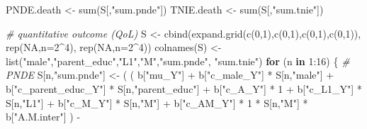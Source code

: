 \documentclass[
]{book}
\newenvironment{Shaded}{\begin{snugshade}}{\end{snugshade}}
\newcommand{\AttributeTok}[1]{\textcolor[rgb]{0.77,0.63,0.00}{#1}}
\newcommand{\CommentTok}[1]{\textcolor[rgb]{0.56,0.35,0.01}{\textit{#1}}}
\newcommand{\ConstantTok}[1]{\textcolor[rgb]{0.00,0.00,0.00}{#1}}
\newcommand{\ControlFlowTok}[1]{\textcolor[rgb]{0.13,0.29,0.53}{\textbf{#1}}}
\newcommand{\DecValTok}[1]{\textcolor[rgb]{0.00,0.00,0.81}{#1}}
\newcommand{\FunctionTok}[1]{\textcolor[rgb]{0.00,0.00,0.00}{#1}}
\newcommand{\NormalTok}[1]{#1}
\newcommand{\OtherTok}[1]{\textcolor[rgb]{0.56,0.35,0.01}{#1}}
\newcommand{\SpecialCharTok}[1]{\textcolor[rgb]{0.00,0.00,0.00}{#1}}
\newcommand{\StringTok}[1]{\textcolor[rgb]{0.31,0.60,0.02}{#1}}
\begin{document}
\begin{Shaded}
\begin{Highlighting}[]
\NormalTok{  PNDE.death }\OtherTok{\textless{}{-}} \FunctionTok{sum}\NormalTok{(S[,}\StringTok{"sum.pnde"}\NormalTok{])}
\NormalTok{  TNIE.death }\OtherTok{\textless{}{-}} \FunctionTok{sum}\NormalTok{(S[,}\StringTok{"sum.tnie"}\NormalTok{])}
  
  
  \CommentTok{\# quantitative outcome (QoL)}
\NormalTok{  S }\OtherTok{\textless{}{-}} \FunctionTok{cbind}\NormalTok{(}\FunctionTok{expand.grid}\NormalTok{(}\FunctionTok{c}\NormalTok{(}\DecValTok{0}\NormalTok{,}\DecValTok{1}\NormalTok{),}\FunctionTok{c}\NormalTok{(}\DecValTok{0}\NormalTok{,}\DecValTok{1}\NormalTok{),}\FunctionTok{c}\NormalTok{(}\DecValTok{0}\NormalTok{,}\DecValTok{1}\NormalTok{),}\FunctionTok{c}\NormalTok{(}\DecValTok{0}\NormalTok{,}\DecValTok{1}\NormalTok{)), }\FunctionTok{rep}\NormalTok{(}\ConstantTok{NA}\NormalTok{,}\AttributeTok{n=}\DecValTok{2}\SpecialCharTok{\^{}}\DecValTok{4}\NormalTok{), }\FunctionTok{rep}\NormalTok{(}\ConstantTok{NA}\NormalTok{,}\AttributeTok{n=}\DecValTok{2}\SpecialCharTok{\^{}}\DecValTok{4}\NormalTok{))}
  \FunctionTok{colnames}\NormalTok{(S) }\OtherTok{\textless{}{-}} \FunctionTok{list}\NormalTok{(}\StringTok{"male"}\NormalTok{,}\StringTok{"parent\_educ"}\NormalTok{,}\StringTok{"L1"}\NormalTok{,}\StringTok{"M"}\NormalTok{,}\StringTok{"sum.pnde"}\NormalTok{, }\StringTok{"sum.tnie"}\NormalTok{)}
  \ControlFlowTok{for}\NormalTok{ (n }\ControlFlowTok{in} \DecValTok{1}\SpecialCharTok{:}\DecValTok{16}\NormalTok{) \{}
    \CommentTok{\# PNDE }
\NormalTok{    S[n,}\StringTok{"sum.pnde"}\NormalTok{] }\OtherTok{\textless{}{-}}\NormalTok{ ( ( b[}\StringTok{"mu\_Y"}\NormalTok{] }\SpecialCharTok{+} 
\NormalTok{                             b[}\StringTok{"c\_male\_Y"}\NormalTok{] }\SpecialCharTok{*}\NormalTok{ S[n,}\StringTok{"male"}\NormalTok{] }\SpecialCharTok{+} 
\NormalTok{                             b[}\StringTok{"c\_parent\_educ\_Y"}\NormalTok{] }\SpecialCharTok{*}\NormalTok{ S[n,}\StringTok{"parent\_educ"}\NormalTok{] }\SpecialCharTok{+} 
\NormalTok{                             b[}\StringTok{"c\_A\_Y"}\NormalTok{] }\SpecialCharTok{*} \DecValTok{1} \SpecialCharTok{+} 
\NormalTok{                             b[}\StringTok{"c\_L1\_Y"}\NormalTok{] }\SpecialCharTok{*}\NormalTok{ S[n,}\StringTok{"L1"}\NormalTok{] }\SpecialCharTok{+}
\NormalTok{                             b[}\StringTok{"c\_M\_Y"}\NormalTok{] }\SpecialCharTok{*}\NormalTok{ S[n,}\StringTok{"M"}\NormalTok{] }\SpecialCharTok{+}
\NormalTok{                             b[}\StringTok{"c\_AM\_Y"}\NormalTok{] }\SpecialCharTok{*} \DecValTok{1} \SpecialCharTok{*}\NormalTok{ S[n,}\StringTok{"M"}\NormalTok{] }\SpecialCharTok{*}\NormalTok{ b[}\StringTok{"A.M.inter"}\NormalTok{] ) }\SpecialCharTok{{-}} 

\end{Highlighting}
\end{Shaded}
\end{document}
